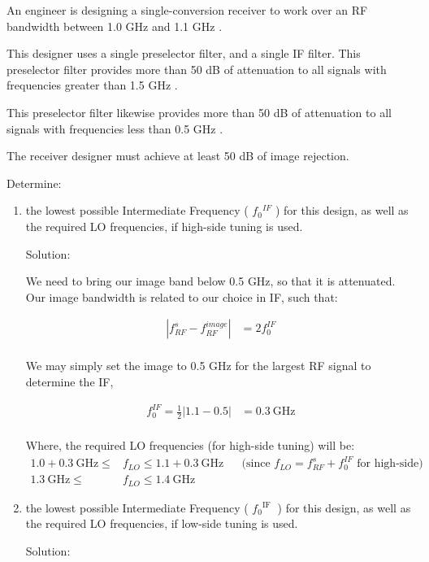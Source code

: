 \newpage
\begin{homeworkProblem}
    An engineer is designing a single-conversion receiver to work over an RF bandwidth between 1.0 GHz and 1.1 GHz .

    This designer uses a single preselector filter, and a single IF filter.
    This preselector filter provides more than 50 dB of attenuation to all signals with frequencies greater than 1.5 GHz .

    This preselector filter likewise provides more than 50 dB of attenuation to all signals with frequencies less than 0.5 GHz .

    The receiver designer must achieve at least 50 dB of image rejection.

    Determine:
    \begin{enumerate}[1.]
        \item the lowest possible Intermediate Frequency ( $f_0{ }^{I F}$ ) for this design, as well as the required LO frequencies, if high-side tuning is used.
            \begin{callout}{Solution:}

                We need to bring our image band below 0.5 GHz, so that it is attenuated. Our image bandwidth is related to our choice in IF, such that:

                \begin{align*}
                    |f_{RF}^{s} - f_{RF}^{image}| &= 2f_{0}^{IF} \\
            \end{align*}

            We may simply set the image to 0.5 GHz for the largest RF signal to determine the IF,

            \begin{align*}
                f_{0}^{IF} = \tfrac{1}{2}|1.1 - 0.5| &= 0.3\mathrm{~GHz} \\
            \end{align*}

            Where, the required LO frequencies (for high-side tuning) will be:
            \begin{align*}
                1.0 + 0.3 \mathrm{~GHz} \leq &f_{LO}\leq 1.1 + 0.3 \mathrm{~GHz} &&\text{(since $f_{LO}=f_{RF}^{s}+f_{0}^{IF}$ for high-side)} \\
                1.3\mathrm{~GHz} \leq &f_{LO}\leq 1.4\mathrm{~GHz}
            \end{align*}

        \end{callout}
    \item the lowest possible Intermediate Frequency ( $f_0{ }^{\text {IF }}$ ) for this design, as well as the required LO frequencies, if low-side tuning is used.
        \begin{callout}{Solution:}


\end{callout}
\end{enumerate}
\end{homeworkProblem}
